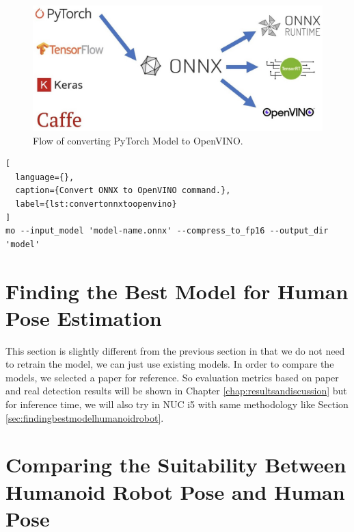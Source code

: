 \begin{figure}[ht]
  \centering
  \includegraphics[scale=0.45]{gambar/pytorch-onnx-openvino.jpg}
  \caption{Flow of converting PyTorch Model to OpenVINO.}
  \label{fig:pytorch-to-openvino}
\end{figure}



\begin{lstlisting}[
  language={},
  caption={Convert ONNX to OpenVINO command.},
  label={lst:convertonnxtoopenvino}
]
mo --input_model 'model-name.onnx' --compress_to_fp16 --output_dir 'model'
\end{lstlisting}




\section{Finding the Best Model for Human Pose Estimation}
\label{sec:findingbestmodelhumanrobot}

This section is slightly different from the previous section in that we do not need to retrain the model, we can just use existing models.
In order to compare the models, we selected a paper for reference. So evaluation metrics based on paper and real detection results will be shown in Chapter \ref{chap:resultsandiscussion} but for inference time, we will also try in NUC i5 with same methodology like Section \ref{sec:findingbestmodelhumanoidrobot}.

\section{Comparing the Suitability Between Humanoid Robot Pose and Human Pose}
\label{sec:comparingsuitability}

